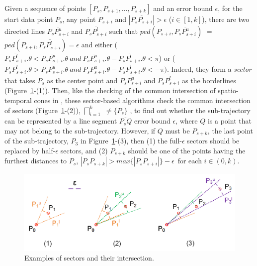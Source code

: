 Given a sequence of points $[P_{s}, P_{s+1}, \ldots, P_{s+k}]$ and an error bound $\epsilon$,
for the start data point $P_s$, any point $P_{s+i}$ and $|\overline{P_sP_{s+i}}|>\epsilon$ ($i\in[1, k]$), there are two directed lines $\overline{P_sP^u_{s+i}}$ and $\overline{P_sP^l_{s+i}}$ such that $ped(P_{s+i}, \overline{P_sP^u_{s+i}})$ $=$ $ped(P_{s+i}, \overline{P_sP^l_{s+i}}) = \epsilon$ and either ($\overline{P_sP^l_{s+i}}.\theta < \overline{P_sP^u_{s+i}}.\theta ~and~\overline{P_sP^u_{s+i}}.\theta - \overline{P_sP^l_{s+i}}.\theta <\pi$) or ($\overline{P_sP^l_{s+i}}.\theta > \overline{P_sP^u_{s+i}}.\theta ~and~ \overline{P_sP^u_{s+i}}.\theta - \overline{P_sP^l_{s+i}}.\theta < -\pi)$. Indeed, they form a \emph{sector}  that takes $P_s$ as the center point and $\overline{P_sP^u_{s+i}}$ and $\overline{P_sP^l_{s+i}}$ as the borderlines (Figure~\ref{fig:sleeve}-(1)).
%
Then, like the checking of the common intersection of spatio-temporal cones in \cised, these sector-based algorithms check the common intersection of sectors (Figure~\ref{fig:sleeve}-(2)), \ie $\bigsqcap_{i=1}^{k}$ $\ne \{P_s\}$ \cite{Williams:Longest, Sklansky:Cone,Zhao:Sleeve}, to find out whether the sub-trajectory can be represented by a line segment $\overline{P_sQ}$ \wrt error bound $\epsilon$, where $Q$ is a point that may not belong to the sub-trajectory. However, if $Q$ must be $P_{s+k}$, the last point of the sub-trajectory, \eg $P_3$ in Figure~\ref{fig:sleeve}-(3),  then (1) the full-$\epsilon$ sectors should be replaced by half-$\epsilon$ sectors, and (2) $P_{s+k}$ should be one of the points having the furthest distances to $P_s$, \ie $|P_sP_{s+k}| > max\{|P_sP_{s+i}|\} - \epsilon$~for each $i \in (0, k)$. 
%

\begin{figure}[tb!]
	\centering
	\includegraphics[scale=0.9]{figures/Fig-Sleeve.png}
	\vspace{-2ex}
	\caption{\small Examples of sectors and their intersection.}
	\vspace{-2ex}
	\label{fig:sleeve}
\end{figure}


